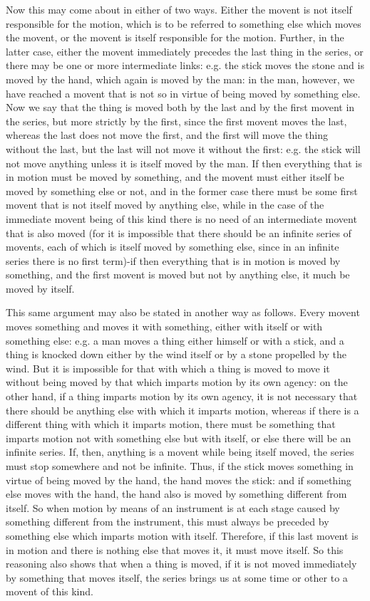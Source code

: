 Now this may come about in either of two ways. Either the movent is
not itself responsible for the motion, which is to be referred to
something else which moves the movent, or the movent is itself responsible
for the motion. Further, in the latter case, either the movent immediately
precedes the last thing in the series, or there may be one or more
intermediate links: e.g. the stick moves the stone and is moved by
the hand, which again is moved by the man: in the man, however, we
have reached a movent that is not so in virtue of being moved by something
else. Now we say that the thing is moved both by the last and by the
first movent in the series, but more strictly by the first, since
the first movent moves the last, whereas the last does not move the
first, and the first will move the thing without the last, but the
last will not move it without the first: e.g. the stick will not move
anything unless it is itself moved by the man. If then everything
that is in motion must be moved by something, and the movent must
either itself be moved by something else or not, and in the former
case there must be some first movent that is not itself moved by anything
else, while in the case of the immediate movent being of this kind
there is no need of an intermediate movent that is also moved (for
it is impossible that there should be an infinite series of movents,
each of which is itself moved by something else, since in an infinite
series there is no first term)-if then everything that is in motion
is moved by something, and the first movent is moved but not by anything
else, it much be moved by itself. 

This same argument may also be stated in another way as follows. Every
movent moves something and moves it with something, either with itself
or with something else: e.g. a man moves a thing either himself or
with a stick, and a thing is knocked down either by the wind itself
or by a stone propelled by the wind. But it is impossible for that
with which a thing is moved to move it without being moved by that
which imparts motion by its own agency: on the other hand, if a thing
imparts motion by its own agency, it is not necessary that there should
be anything else with which it imparts motion, whereas if there is
a different thing with which it imparts motion, there must be something
that imparts motion not with something else but with itself, or else
there will be an infinite series. If, then, anything is a movent while
being itself moved, the series must stop somewhere and not be infinite.
Thus, if the stick moves something in virtue of being moved by the
hand, the hand moves the stick: and if something else moves with the
hand, the hand also is moved by something different from itself. So
when motion by means of an instrument is at each stage caused by something
different from the instrument, this must always be preceded by something
else which imparts motion with itself. Therefore, if this last movent
is in motion and there is nothing else that moves it, it must move
itself. So this reasoning also shows that when a thing is moved, if
it is not moved immediately by something that moves itself, the series
brings us at some time or other to a movent of this kind.

